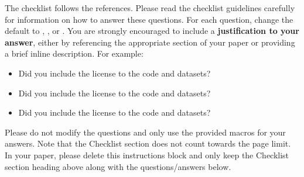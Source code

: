 \documentclass{article}
\begin{document}
The checklist follows the references.  Please
read the checklist guidelines carefully for information on how to answer these
questions.  For each question, change the default \answerTODO{} to \answerYes{},
\answerNo{}, or \answerNA{}.  You are strongly encouraged to include a {\bf
justification to your answer}, either by referencing the appropriate section of
your paper or providing a brief inline description.  For example:
\begin{itemize}
  \item Did you include the license to the code and datasets? \answerYes
  \item Did you include the license to the code and datasets? 
  \item Did you include the license to the code and datasets? \answerNA{}
\end{itemize}
Please do not modify the questions and only use the provided macros for your
answers.  Note that the Checklist section does not count towards the page
limit.  In your paper, please delete this instructions block and only keep the
Checklist section heading above along with the questions/answers below.
\end{document}
